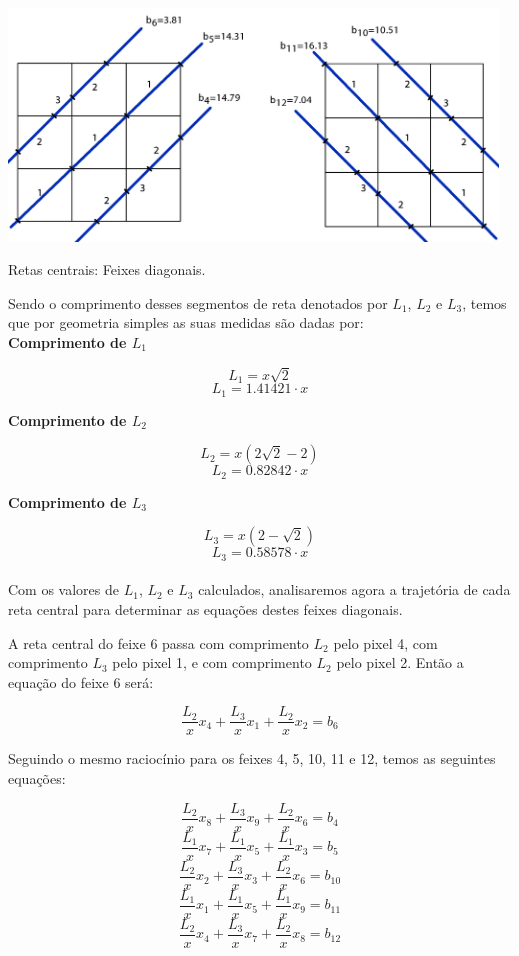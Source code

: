 \documentclass[a4paper, 12pt]{article}
\begin{document}
\begin{center}
    \includegraphics[width=13cm]{10_reta_central_diagonais.fw.png}
    
    Retas centrais: Feixes diagonais.
\end{center}

Sendo o comprimento desses segmentos de reta denotados por $L_1$, $L_2$ e $L_3$, temos que por geometria simples as suas medidas são dadas por:\\

\textbf{Comprimento de $L_1$}

$$L_1=x\sqrt{2}$$
$$\boxed{\ \ L_1=1.41421\cdot x\ \ }$$

\textbf{Comprimento de $L_2$}

$$L_2=x\left(2\sqrt{2}-2\right)$$
$$\boxed{\ \ L_2=0.82842\cdot x\ \ }$$

\textbf{Comprimento de $L_3$}

$$L_3=x\left(2-\sqrt{2}\right)$$
$$\boxed{\ \ L_3=0.58578\cdot x\ \ }$$\\

Com os valores de $L_1$, $L_2$ e $L_3$ calculados, analisaremos agora a trajetória de cada reta central para determinar as equações destes feixes diagonais.

A reta central do feixe 6 passa com comprimento $L_2$ pelo pixel 4, com comprimento $L_3$ pelo pixel 1, e com comprimento $L_2$ pelo pixel 2. Então a equação do feixe 6 será:

$$\frac{L_2}{x}x_4+\frac{L_3}{x}x_1+\frac{L_2}{x}x_2=b_6$$

Seguindo o mesmo raciocínio para os feixes 4, 5, 10, 11 e 12, temos as seguintes equações:

$$\frac{L_2}{x}x_8+\frac{L_3}{x}x_9+\frac{L_2}{x}x_6=b_4$$
$$\frac{L_1}{x}x_7+\frac{L_1}{x}x_5+\frac{L_1}{x}x_3=b_5$$
$$\frac{L_2}{x}x_2+\frac{L_3}{x}x_3+\frac{L_2}{x}x_6=b_{10}$$
$$\frac{L_1}{x}x_1+\frac{L_1}{x}x_5+\frac{L_1}{x}x_9=b_{11}$$
$$\frac{L_2}{x}x_4+\frac{L_3}{x}x_7+\frac{L_2}{x}x_8=b_{12}$$
\end{document}
